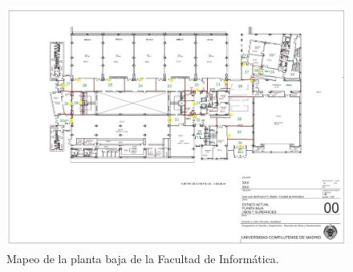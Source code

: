 \begin{figure}[t]
	\centering
	\includegraphics[width=1\textwidth]{Imagenes/Descripciondeltrabajo/mapaplantabaja_cuadrantes3}
	\caption{Mapeo de la planta baja de la Facultad de Informática.}
	\label{fig:cuadrantesPbaja}
\end{figure}

